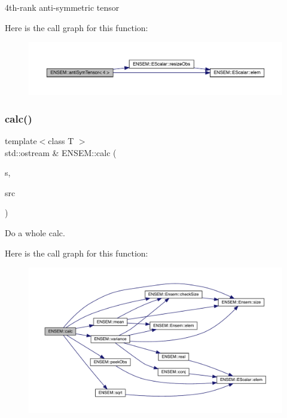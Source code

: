 4th-\/rank anti-\/symmetric tensor 

Here is the call graph for this function\+:\nopagebreak
\begin{figure}[H]
\begin{center}
\leavevmode
\includegraphics[width=350pt]{d2/d94/namespaceENSEM_a6065b3f3c5f3e116256e3897ce3ca1d5_cgraph}
\end{center}
\end{figure}
\mbox{\label{namespaceENSEM_a6bddab1f5c5944deb2e2e9340fa6df10}} 
\subsubsection{\texorpdfstring{calc()}{calc()}}
{\footnotesize\ttfamily template$<$class T $>$ \\
std\+::ostream \& E\+N\+S\+E\+M\+::calc (\begin{DoxyParamCaption}\item[{std\+::ostream \&}]{s,  }\item[{const \mbox{\hyperlink{classENSEM_1_1Ensem}{Ensem}}$<$ T $>$ \&}]{src }\end{DoxyParamCaption})\hspace{0.3cm}{\ttfamily [inline]}}



Do a whole calc. 

Here is the call graph for this function\+:\nopagebreak
\begin{figure}[H]
\begin{center}
\leavevmode
\includegraphics[width=350pt]{d2/d94/namespaceENSEM_a6bddab1f5c5944deb2e2e9340fa6df10_cgraph}
\end{center}
\end{figure}
\mbox{\label{namespaceENSEM_a7858a8fd90447e56b22d0e84f6059d3f}} 
